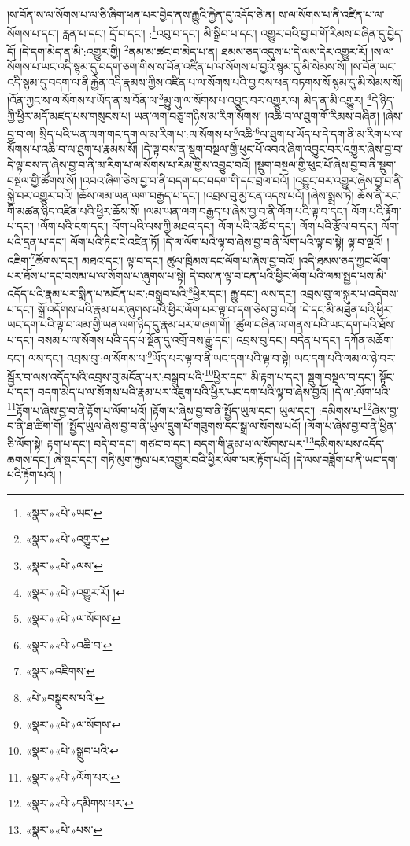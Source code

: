 །ས་བོན་ས་ལ་སོགས་པ་ལ་ཅི་ཞིག་ཕན་པར་བྱེད་ནས་རྒྱུའི་རྐྱེན་དུ་འདོད་ཅེ་ན། ས་ལ་སོགས་པ་ནི་འཛིན་པ་ལ་སོགས་པ་དང་། རླན་པ་དང་། དྲོ་བ་དང་། :\footnote{«སྣར་»«པེ་»ཡང་}འབུ་བ་དང་། མི་སྒྲིབ་པ་དང་། འགྱུར་བའི་བྱ་བ་གོ་རིམས་བཞིན་དུ་བྱེད་དོ། །དེ་དག་མེད་ན་མི་:འགྱུར་གྱི། \footnote{«སྣར་»«པེ་»འགྱུར་}ནམ་མ་ཚང་བ་མེད་པ་ན། ཐམས་ཅད་འདུས་པ་དེ་ལས་དེར་འགྱུར་རོ། །ས་ལ་སོགས་པ་ཡང་འདི་སྙམ་དུ་བདག་ཅག་གིས་ས་བོན་འཛིན་པ་ལ་སོགས་པ་བྱའོ་སྙམ་དུ་མི་སེམས་སོ། །ས་བོན་ཡང་འདི་སྙམ་དུ་བདག་ལ་ནི་རྐྱེན་འདི་རྣམས་ཀྱིས་འཛིན་པ་ལ་སོགས་པའི་བྱ་བས་ཕན་བཏགས་སོ་སྙམ་དུ་མི་སེམས་སོ། །འོན་ཀྱང་ས་ལ་སོགས་པ་ཡོད་ན་ས་བོན་ལ་\footnote{«སྣར་»«པེ་»ལས་}མྱུ་གུ་ལ་སོགས་པ་འབྱུང་བར་འགྱུར་ལ། མེད་ན་མི་འགྱུར། \footnote{«སྣར་»«པེ་»འགྱུར་རོ། ། }དེ་ཉིད་ཀྱི་ཕྱིར་མདོ་མཛད་པས་གསུངས་པ། ཡན་ལག་བཅུ་གཉིས་མ་རིག་སོགས། །འཆི་བ་ལ་ཐུག་གོ་རིམས་བཞིན། །ཞེས་བྱ་བ་ལ། སྲིད་པའི་ཡན་ལག་གང་དག་ལ་མ་རིག་པ་:ལ་སོགས་པ་\footnote{«སྣར་»«པེ་»ལ་སོགས་}འཆི་\footnote{«སྣར་»«པེ་»འཆི་བ་}ལ་ཐུག་པ་ཡོད་པ་དེ་དག་ནི་མ་རིག་པ་ལ་སོགས་པ་འཆི་བ་ལ་ཐུག་པ་རྣམས་སོ། །དེ་ལྟ་བས་ན་སྡུག་བསྔལ་གྱི་ཕུང་པོ་འབའ་ཞིག་འབྱུང་བར་འགྱུར་ཞེས་བྱ་བ་དེ་ལྟ་བས་ན་ཞེས་བྱ་བ་ནི་མ་རིག་པ་ལ་སོགས་པ་རིམ་གྱིས་འབྱུང་བའོ། །སྡུག་བསྔལ་གྱི་ཕུང་པོ་ཞེས་བྱ་བ་ནི་སྡུག་བསྔལ་གྱི་ཚོགས་སོ། །འབའ་ཞིག་ཅེས་བྱ་བ་ནི་བདག་དང་བདག་གི་དང་བྲལ་བའོ། །འབྱུང་བར་འགྱུར་ཞེས་བྱ་བ་ནི་སྐྱེ་བར་འགྱུར་བའོ། །ཆོས་ལམ་ཡན་ལག་བརྒྱད་པ་དང་། །འབྲས་བུ་མྱ་ངན་འདས་པའོ། །ཞེས་སྨྲས་ཏེ། ཆོས་ནི་རང་གི་མཚན་ཉིད་འཛིན་པའི་ཕྱིར་ཆོས་སོ། །ལམ་ཡན་ལག་བརྒྱད་པ་ཞེས་བྱ་བ་ནི་ལོག་པའི་ལྟ་བ་དང་། ལོག་པའི་རྟོག་པ་དང་། །ལོག་པའི་ངག་དང་། ལོག་པའི་ལས་ཀྱི་མཐའ་དང་། ལོག་པའི་འཚོ་བ་དང་། ལོག་པའི་རྩོལ་བ་དང་། ལོག་པའི་དྲན་པ་དང་། ལོག་པའི་ཏིང་ངེ་འཛིན་ཏོ། །དེ་ལ་ལོག་པའི་ལྟ་བ་ཞེས་བྱ་བ་ནི་ལོག་པའི་ལྟ་བ་སྟེ། ལྟ་བ་ལྔའོ། །འཇིག་\footnote{«སྣར་»འཇིགས་}ཚོགས་དང་། མཐའ་དང་། ལྟ་བ་དང་། ཚུལ་ཁྲིམས་དང་ལོག་པ་ཞེས་བྱ་བའོ། །འདི་ཐམས་ཅད་ཀྱང་ལོག་པར་ཐོས་པ་དང་བསམ་པ་ལ་སོགས་པ་ཞུགས་པ་སྟེ། དེ་བས་ན་ལྟ་བ་ངན་པའི་ཕྱིར་ལོག་པའི་ལམ་སྤྱད་པས་མི་འདོད་པའི་རྣམ་པར་སྨིན་པ་མངོན་པར་:བསྒྲུབ་པའི་\footnote{«པེ་»བསྒྲུབས་པའི་}ཕྱིར་དང་། རྒྱུ་དང་། ལས་དང་། འབྲས་བུ་ལ་སྐུར་པ་འདེབས་པ་དང་། སྒྲོ་འདོགས་པའི་རྣམ་པར་ཞུགས་པའི་ཕྱིར་ལོག་པར་ལྟ་བ་དག་ཅེས་བྱ་བའོ། །དེ་དང་མི་མཐུན་པའི་ཕྱིར་ཡང་དག་པའི་ལྟ་བ་ལམ་གྱི་ཡན་ལག་ཉིད་དུ་རྣམ་པར་གཞག་གོ། །ཚུལ་བཞིན་ལ་གནས་པའི་ཡང་དག་པའི་ཐོས་པ་དང་། བསམ་པ་ལ་སོགས་པའི་དད་པ་སྔོན་དུ་འགྲོ་བས་རྒྱུ་དང་། འབྲས་བུ་དང་། བདེན་པ་དང་། དཀོན་མཆོག་དང་། ལས་དང་། འབྲས་བུ་:ལ་སོགས་པ་\footnote{«སྣར་»«པེ་»ལ་སོགས་}ཡོད་པར་ལྟ་བ་ནི་ཡང་དག་པའི་ལྟ་བ་སྟེ། ཡང་དག་པའི་ལམ་ལ་ཉེ་བར་སྦྱོར་བ་ལས་འདོད་པའི་འབྲས་བུ་མངོན་པར་:བསྒྲུབ་པའི་\footnote{«སྣར་»«པེ་»སྒྲུབ་པའི་}ཕྱིར་དང་། མི་རྟག་པ་དང་། སྡུག་བསྔལ་བ་དང་། སྟོང་པ་དང་། བདག་མེད་པ་ལ་སོགས་པའི་རྣམ་པར་འཇུག་པའི་ཕྱིར་ཡང་དག་པའི་ལྟ་བ་ཞེས་བྱའོ། །དེ་ལ་:ལོག་པའི་\footnote{«སྣར་»«པེ་»ལོག་པར་}རྟོག་པ་ཞེས་བྱ་བ་ནི་རྟོག་པ་ལོག་པའོ། །རྟོག་པ་ཞེས་བྱ་བ་ནི་སྤྱོད་ཡུལ་དང་། ཡུལ་དང་། :དམིགས་པ་\footnote{«སྣར་»«པེ་»དམིགས་པར་}ཞེས་བྱ་བ་ནི་ཐ་ཚིག་གོ། །སྤྱོད་ཡུལ་ཞེས་བྱ་བ་ནི་ཡུལ་དྲུག་པོ་གཟུགས་དང་སྒྲ་ལ་སོགས་པའོ། །ལོག་པ་ཞེས་བྱ་བ་ནི་ཕྱིན་ཅི་ལོག་སྟེ། རྟག་པ་དང་། བདེ་བ་དང་། གཙང་བ་དང་། བདག་གི་རྣམ་པ་ལ་སོགས་པར་\footnote{«སྣར་»«པེ་»པས་}དམིགས་པས་འདོད་ཆགས་དང་། ཞེ་སྡང་དང་། གཏི་མུག་རྒྱས་པར་འགྱུར་བའི་ཕྱིར་ལོག་པར་རྟོག་པའོ། །དེ་ལས་བཟློག་པ་ནི་ཡང་དག་པའི་རྟོག་པའོ། །
